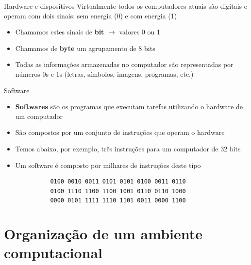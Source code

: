 \documentclass[handout]{beamer}
\begin{document}
\begin{frame}{Hardware e dispositivos}
    Virtualmente todos os computadores atuais são digitais e operam com dois sinais: sem energia (0) e com energia (1)
    
    \begin{itemize}[<+->]
        \item Chamamos estes sinais de {\bf bit} $\rightarrow$ valores 0 ou 1
        \item Chamamos de {\bf byte} um agrupamento de 8 bits
        \item Todas as informações armazenadas no computador são representadas por números 0s e 1s (letras, símbolos, imagens, programas, etc.)
    \end{itemize}
\end{frame}

\begin{frame}[fragile]{Software}

    \begin{itemize}[<+->]
        \item {\bf Softwares} são os programas que executam tarefas utilizando o hardware de um computador
        \item São compostos por um conjunto de instruções que operam o hardware
        \item Temos abaixo, por exemplo, três instruções para um computador de 32 bits
        \item Um software é composto por milhares de instruções deste tipo
        \begin{verbatim}
          0100 0010 0011 0101 0101 0100 0011 0110
          0100 1110 1100 1100 1001 0110 0110 1000
          0000 0101 1111 1110 1101 0011 0000 1100
        \end{verbatim}
    \end{itemize}
\end{frame}


\section{Organização de um ambiente computacional}
\end{document}
